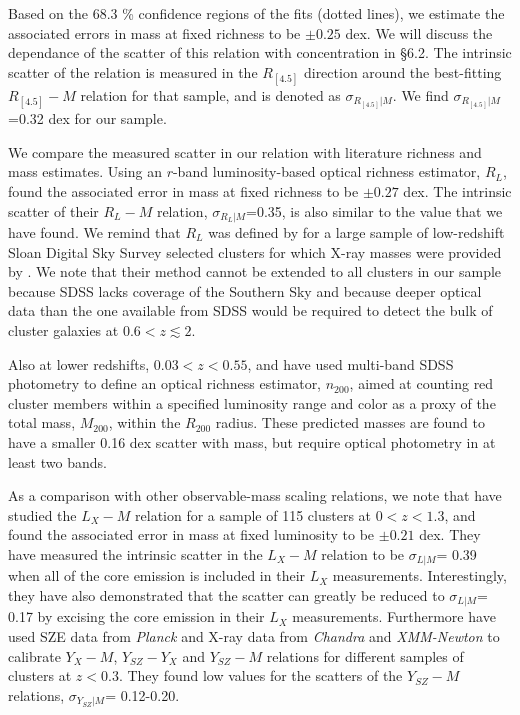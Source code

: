 \documentclass[apj,twocolumn]{emulateapj}
\begin{document}
{Based on the 68.3 \% confidence regions of the fits (dotted lines), we estimate the associated errors in mass at fixed richness to be $\pm 0.25$ dex. We will discuss the dependance of the scatter of this relation with concentration in \S 6.2. The intrinsic scatter of the relation is measured in the $R_{[4.5]}$ direction around the best-fitting  $R_{[4.5]}-M$ relation for that sample, and is denoted as $\sigma_{R_{[4.5]} | M}$. We find $\sigma_{R_{[4.5]} | M}$=0.32 dex for our sample.

We compare the measured scatter in our relation with literature richness and mass estimates. Using an $r$-band luminosity-based optical richness estimator, $R_{L}$,  \citet{Planck14} found the associated error in mass at fixed richness to be $\pm 0.27$ dex. The intrinsic scatter of their $R_{L}-M$ relation, $\sigma_{R_{L} | M}$=0.35, is also similar to the value that we have found.   We remind that  $R_{L}$ was defined by \citet{Wen12} for a large sample of low-redshift Sloan Digital Sky Survey \citep[SDSS,][]{York00} selected clusters for which X-ray masses were provided by \citet{Piffaretti11}. We note that their method cannot be extended to all clusters in our sample because SDSS lacks coverage of the Southern Sky and because deeper optical data than the one available from SDSS would be required to detect the bulk of cluster galaxies at $0.6 < z \lesssim 2$.

Also at lower redshifts,  $0.03 <z< 0.55$, \citet{Andreon10} and \citet{Andreon15} have used multi-band SDSS photometry to define an optical richness estimator, $n_{200}$, aimed at counting red cluster members within a specified luminosity range and color as a proxy of the total mass, $M_{200}$,  within the $R_{200}$ radius. These predicted masses are found to have a smaller 0.16 dex scatter with mass, but require optical photometry in at least two bands.

As a comparison with other observable-mass scaling relations, we note that \citet{Maughan07} have studied the  $L_{X}-M$ relation for a sample of 115 clusters at $0< z< 1.3$, and found the associated error in mass at fixed luminosity to be $\pm 0.21$ dex. They have measured the intrinsic scatter in the $L_{X}-M$ relation to be $\sigma_{L | M}$= 0.39 when all of the core emission is included in their $L_{X}$ measurements. Interestingly, they have also demonstrated that the scatter can greatly be reduced to $\sigma_{L | M}$= 0.17 by excising the core emission in their $L_{X}$  measurements. 
Furthermore \citet{Rozo14a, Rozo14b} have used SZE data from {\it Planck} and X-ray data from {\it Chandra} and {\it XMM-Newton} to calibrate $Y_{X}-M$,  $Y_{SZ}-Y_{X}$  and $Y_{SZ}-M$ relations for different samples of clusters at $z<0.3$. They found low values for the scatters of the $Y_{SZ}-M$ relations,  $\sigma_{Y_{SZ} | M}$= 0.12-0.20.

}
\end{document}
